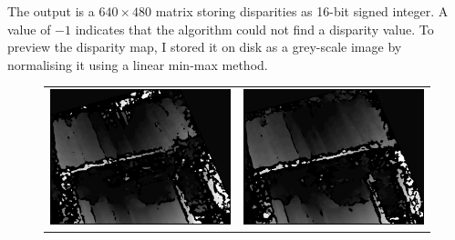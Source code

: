 \documentclass[11pt]{report}
\begin{document}
The output is a $640\times480$ matrix storing disparities as 16-bit signed integer. A value of $-1$ indicates that the algorithm could not find a disparity value. To preview the disparity map, I stored it on disk as a grey-scale image by normalising it using a linear min-max method.

\begin{figure}[H]
    \centering
    \begin{tabular}{cc}
    \includegraphics[scale=0.2]{images/disparity_0.png} &
    \includegraphics[scale=0.2]{images/disparity_1.png} \\

\end{tabular}
\end{figure}
\end{document}
